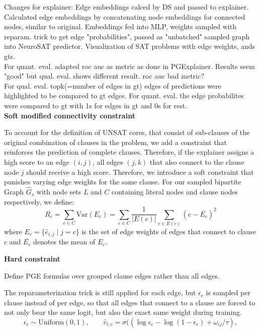 Changes for explainer:
Edge embeddings calced by DS and passed to explainer. Calculated edge embeddings by concatenating node embeddings for connected nodes, similar to original. Embeddings fed into MLP, weights sampled with reparam. trick to get edge "probabilities", passed as "unbatched" sampled graph into NeuroSAT predictor. Visualization of SAT problems with edge weights, ands gts. \\
For quant. eval. adapted roc auc as metric as done in PGExplainer. Results seem "good" but qual. eval. shows different result. roc auc bad metric? \\
For qual. eval. topk(=number of edges in gt) edges of predictions were highlighted to be compared to gt edges. For quant. eval. the edge probabilites were compared to gt with 1s for edges in gt and 0s for rest. \\


\textbf{Soft modified connectivity constraint}

To account for the definition of UNSAT cores, that consist of sub-clauses of the original combination of clauses in the problem, we add a constraint that reinforces the prediction of complete clauses. Therefore, if the explainer assigns a high score to an edge $(i,j)$, all edges $(j,k)$ that also connect to the clause node $j$ should receive a high score. Therefore, we introduce a soft constraint that punishes varying edge weights for the same clause. For our sampled bipartite Graph $\hat{G}_s$ with node sets $L$ and $C$ containing literal nodes and clause nodes respectively, we define:
\begin{equation*}
    R_c = \sum_{c \in C}  \text{Var}(E_c) = \sum_{c \in C} \frac{1}{|E(c)|} \sum_{e \in E(c)} (e - \bar{E_c})^2
\end{equation*}
where $E_c = \{\hat{e}_{i,j} \mid j=c\}$ is the set of edge weights of edges that connect to clause $c$ and $\bar{E_c}$ denotes the mean of $E_c$.


\textbf{Hard constraint}

Define PGE formulas over grouped clause edges rather than all edges.

The reparameterization trick is still applied for each edge, but $\epsilon_c$ is sampled per clause instead of per edge, so that all edges that connect to a clause are forced to not only bear the same logit, but also the exact same weight during training.
\begin{equation}
    \epsilon_c \sim \text{Uniform}(0,1), \qquad \hat{e}_{l,c}=\sigma((\log \epsilon_c - \log(1-\epsilon_c)+\omega_{ij}/\tau),
\end{equation}

